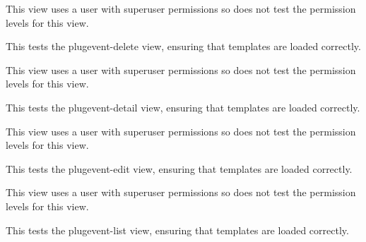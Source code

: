 \documentclass[letterpaper,10pt,english]{sphinxmanual}
\begin{document}
\begin{fulllineitems}
\begin{fulllineitems}
This view uses a user with superuser permissions so does not test the permission levels for this view.

\end{fulllineitems}


\begin{fulllineitems}
\label{timed_mating:mousedb.timed_mating.tests.Timed_MatingViewTests.test_plugevent_delete}
This tests the plugevent-delete view, ensuring that templates are loaded correctly.

This view uses a user with superuser permissions so does not test the permission levels for this view.

\end{fulllineitems}


\begin{fulllineitems}
\label{timed_mating:mousedb.timed_mating.tests.Timed_MatingViewTests.test_plugevent_detail}
This tests the plugevent-detail view, ensuring that templates are loaded correctly.

This view uses a user with superuser permissions so does not test the permission levels for this view.

\end{fulllineitems}


\begin{fulllineitems}
\label{timed_mating:mousedb.timed_mating.tests.Timed_MatingViewTests.test_plugevent_edit}
This tests the plugevent-edit view, ensuring that templates are loaded correctly.

This view uses a user with superuser permissions so does not test the permission levels for this view.

\end{fulllineitems}


\begin{fulllineitems}
\label{timed_mating:mousedb.timed_mating.tests.Timed_MatingViewTests.test_plugevent_list}
This tests the plugevent-list view, ensuring that templates are loaded correctly.


\end{fulllineitems}
\end{fulllineitems}
\end{document}
